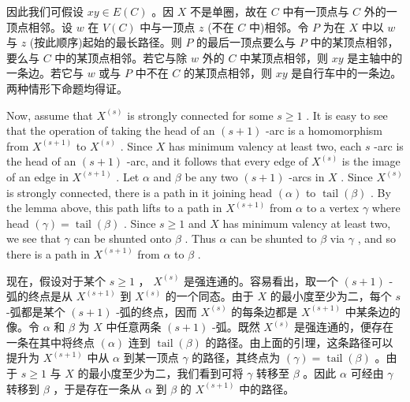\documentclass[10pt]{article}
\begin{document}
\begin{tcolorbox}\relax
因此我们可假设 \({xy} \in  E\left( C\right)\) 。因 \(X\) 不是单圈，故在 \(C\) 中有一顶点与 \(C\) 外的一顶点相邻。设 \(w\) 在 \(V\left( C\right)\) 中与一顶点 \(z\) (不在 \(C\) 中)相邻。令 \(P\) 为在 \(X\) 中以 \(w\) 与 \(z\) (按此顺序)起始的最长路径。则 \(P\) 的最后一顶点要么与 \(P\) 中的某顶点相邻，要么与 \(C\) 中的某顶点相邻。若它与除 \(w\) 外的 \(C\) 中某顶点相邻，则 \({xy}\) 是主轴中的一条边。若它与 \(w\) 或与 \(P\) 中不在 \(C\) 的某顶点相邻，则 \({xy}\) 是自行车中的一条边。两种情形下命题均得证。
\end{tcolorbox}

Now, assume that \({X}^{\left( s\right) }\) is strongly connected for some \(s \geq  1\) . It is easy to see that the operation of taking the head of an \(\left( {s + 1}\right)\) -arc is a homomorphism from \({X}^{\left( s + 1\right) }\) to \({X}^{\left( s\right) }\) . Since \(X\) has minimum valency at least two, each \(s\) -arc is the head of an \(\left( {s + 1}\right)\) -arc, and it follows that every edge of \({X}^{\left( s\right) }\) is the image of an edge in \({X}^{\left( s + 1\right) }\) . Let \(\alpha\) and \(\beta\) be any two \(\left( {s + 1}\right)\) -arcs in \(X\) . Since \({X}^{\left( s\right) }\) is strongly connected, there is a path in it joining head \(\left( \alpha \right)\) to \(\operatorname{tail}\left( \beta \right)\) . By the lemma above, this path lifts to a path in \({X}^{\left( s + 1\right) }\) from \(\alpha\) to a vertex \(\gamma\) where head \(\left( \gamma \right)  = \operatorname{tail}\left( \beta \right)\) . Since \(s \geq  1\) and \(X\) has minimum valency at least two, we see that \(\gamma\) can be shunted onto \(\beta\) . Thus \(\alpha\) can be shunted to \(\beta\) via \(\gamma\) , and so there is a path in \({X}^{\left( s + 1\right) }\) from \(\alpha\) to \(\beta\) .

\begin{tcolorbox}\relax
现在，假设对于某个 \(s \geq  1\) ， \({X}^{\left( s\right) }\) 是强连通的。容易看出，取一个 \(\left( {s + 1}\right)\) -弧的终点是从 \({X}^{\left( s + 1\right) }\) 到 \({X}^{\left( s\right) }\) 的一个同态。由于 \(X\) 的最小度至少为二，每个 \(s\) -弧都是某个 \(\left( {s + 1}\right)\) -弧的终点，因而 \({X}^{\left( s\right) }\) 的每条边都是 \({X}^{\left( s + 1\right) }\) 中某条边的像。令 \(\alpha\) 和 \(\beta\) 为 \(X\) 中任意两条 \(\left( {s + 1}\right)\) -弧。既然 \({X}^{\left( s\right) }\) 是强连通的，便存在一条在其中将终点 \(\left( \alpha \right)\) 连到 \(\operatorname{tail}\left( \beta \right)\) 的路径。由上面的引理，这条路径可以提升为 \({X}^{\left( s + 1\right) }\) 中从 \(\alpha\) 到某一顶点 \(\gamma\) 的路径，其终点为 \(\left( \gamma \right)  = \operatorname{tail}\left( \beta \right)\) 。由于 \(s \geq  1\) 与 \(X\) 的最小度至少为二，我们看到可将 \(\gamma\) 转移至 \(\beta\) 。因此 \(\alpha\) 可经由 \(\gamma\) 转移到 \(\beta\) ，于是存在一条从 \(\alpha\) 到 \(\beta\) 的 \({X}^{\left( s + 1\right) }\) 中的路径。
\end{tcolorbox}
\end{document}
